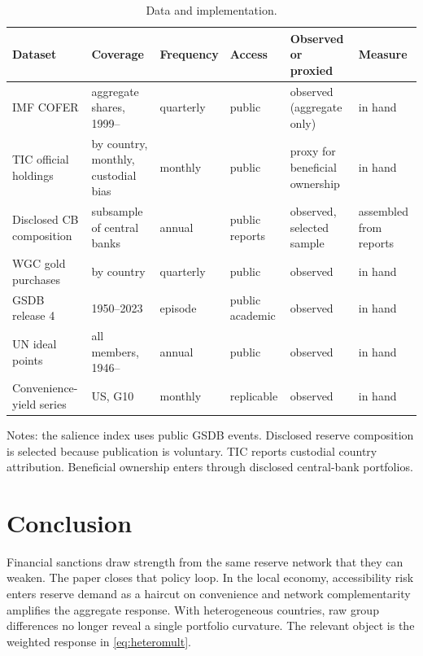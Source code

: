 \documentclass[11pt]{article}
\theoremstyle{definition}
\begin{document}
\begin{table}[t]
\centering
\caption{Data and implementation.}
\label{tab:feas2}
\footnotesize
\setlength{\tabcolsep}{4pt}
\begin{tabular}{p{3.2cm}p{2.6cm}p{1.5cm}p{1.6cm}p{2.6cm}p{1.7cm}}
\toprule
Dataset & Coverage & Frequency & Access & Observed or proxied & Measure \\
\midrule
IMF COFER & aggregate shares, 1999-- & quarterly & public & observed (aggregate only) & in hand \\
TIC official holdings & by country, monthly, custodial bias & monthly & public & proxy for beneficial ownership & in hand \\
Disclosed CB composition & subsample of central banks & annual & public reports & observed, selected sample & assembled from reports \\
WGC gold purchases & by country & quarterly & public & observed & in hand \\
GSDB release 4 & 1950--2023 & episode & public academic & observed & in hand \\
UN ideal points & all members, 1946-- & annual & public & observed & in hand \\
Convenience-yield series & US, G10 & monthly & replicable & observed & in hand \\
\bottomrule
\end{tabular}
\par\smallskip
\begin{minipage}{0.95\textwidth}
\footnotesize Notes: the salience index uses public GSDB events. Disclosed reserve composition is selected because publication is voluntary. TIC reports custodial country attribution. Beneficial ownership enters through disclosed central-bank portfolios.
\end{minipage}
\end{table}

\section{Conclusion}\label{sec:conclusion}

Financial sanctions draw strength from the same reserve network that they can weaken. The paper closes that policy loop. In the local economy, accessibility risk enters reserve demand as a haircut on convenience and network complementarity amplifies the aggregate response. With heterogeneous countries, raw group differences no longer reveal a single portfolio curvature. The relevant object is the weighted response in \eqref{eq:heteromult}.
\end{document}
